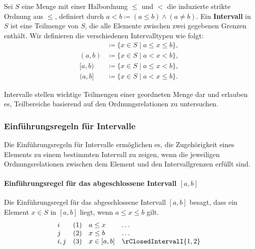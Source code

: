 \documentclass[main.tex]{subfiles}
\begin{document}
\begin{definition}[Intervalle]
    Sei \(S\) eine Menge mit einer Halbordnung \(\leq\) und \(<\) die induzierte strikte Ordnung aus \(\leq\), definiert durch \( a < b \coloneqq (a \leq b) \land (a \neq b) \). Ein \textbf{Intervall} in \(S\) ist eine Teilmenge von \(S\), die alle Elemente zwischen zwei gegebenen Grenzen enthält. Wir definieren die verschiedenen Intervalltypen wie folgt:
    \begin{align*}
        [a, b] &\coloneqq \{ x \in S \mid a \leq x \leq b \}, \\
        (a, b) &\coloneqq \{ x \in S \mid a < x < b \}, \\
        [a, b) &\coloneqq \{ x \in S \mid a \leq x < b \}, \\
        (a, b] &\coloneqq \{ x \in S \mid a < x \leq b \}.
    \end{align*}
\end{definition}

\begin{remark}
    Intervalle stellen wichtige Teilmengen einer geordneten Menge dar und erlauben es, Teilbereiche basierend auf den Ordnungsrelationen zu untersuchen.
\end{remark}

\subsubsection{Einführungsregeln für Intervalle}
\label{rule:rClosedIntervalI} \label{rule:rOpenIntervalI} \label{rule:rClosedOpenIntervalI} \label{rule:rOpenClosedIntervalI}

Die Einführungsregeln für Intervalle ermöglichen es, die Zugehörigkeit eines Elements zu einem bestimmten Intervall zu zeigen, wenn die jeweiligen Ordnungsrelationen zwischen dem Element und den Intervallgrenzen erfüllt sind.

\paragraph{Einführungsregel für das abgeschlossene Intervall \([a, b]\)}
Die Einführungsregel für das abgeschlossene Intervall \([a, b]\) besagt, dass ein Element \(x \in S\) in \([a, b]\) liegt, wenn \(a \leq x \leq b\) gilt.
\[
\begin{array}{llll}
    i   & (1) & a \leq x & \dots \\
    j   & (2) & x \leq b & \dots \\
    i,j & (3) & x \in [a, b] & \rClosedIntervalI{1,2}
\end{array}
\]
\end{document}
